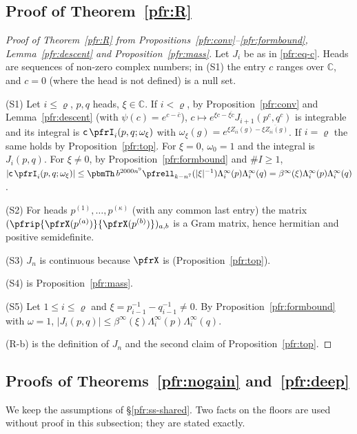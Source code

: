 \documentclass[10pt]{amsart}
\theoremstyle{definition}
\theoremstyle{remark}
\newcommand{\C}{\mathbb C}
\begin{document}
\subsection{Proof of Theorem~\ref{pfr:R}}\label{pfr:ss-Rproof}

\begin{proof}[Proof of Theorem~\ref{pfr:R} from Propositions~\ref{pfr:conv}--\ref{pfr:formbound}, Lemma~\ref{pfr:descent} and Proposition~\ref{pfr:mass}]
Let $J_i$ be as in \eqref{pfr:eq-c}. Heads are sequences of non-zero complex numbers; in (S1) the entry
$c$ ranges over $\C$, and $c=0$ (where the head is not defined) is a null set.

(S1) Let $i\le\varrho$, $p,q$ heads, $\xi\in\C$. If $i<\varrho$, by Proposition~\ref{pfr:conv} and
Lemma~\ref{pfr:descent} (with $\psi(c)=e^{c-\bar c}$), $c\mapsto e^{\xi c-\overline{\xi c}}J_{i+1}(p^c,q^c)$ is
integrable and its integral is $\mathsf c\,\pfrI_i(p,q;\omega_\xi)$ with $\omega_\xi(g)=e^{\xi Z_{ii}(g)-
\overline{\xi Z_{ii}(g)}}$. If $i=\varrho$ the same holds by Proposition~\ref{pfr:top}. For $\xi=0$,
$\omega_0=1$ and the integral is $J_i(p,q)$. For $\xi\ne0$, by Proposition~\ref{pfr:formbound} and
$\#I\ge1$,
$|\mathsf c\,\pfrI_i(p,q;\omega_\xi)|\le\pbmTh\,b^{2000n^9}\pfrell_{k-n^7}(|\xi|^{-1})\Lambda^\infty_i(p)\Lambda^\infty_i(q)
=\beta^\infty(\xi)\Lambda^\infty_i(p)\Lambda^\infty_i(q)$.

(S2) For heads $p^{(1)},\dots,p^{(\kappa)}$ (with any common last entry) the matrix
$(\pfrip{\pfrX(p^{(a)})}{\pfrX(p^{(b)})})_{a,b}$ is a Gram matrix, hence hermitian and positive
semidefinite.

(S3) $J_n$ is continuous because $\pfrX$ is (Proposition~\ref{pfr:top}).

(S4) is Proposition~\ref{pfr:mass}.

(S5) Let $1\le i\le\varrho$ and $\xi=p_{i-1}^{-1}-q_{i-1}^{-1}\ne0$. By Proposition~\ref{pfr:formbound}
with $\omega=1$, $|J_i(p,q)|\le\beta^\infty(\xi)\Lambda^\infty_i(p)\Lambda^\infty_i(q)$.

(R-b) is the definition of $J_n$ and the second claim of Proposition~\ref{pfr:top}.
\end{proof}

\subsection{Proofs of Theorems~\ref{pfr:nogain} and~\ref{pfr:deep}}\label{pfr:ss-gainsproof}

We keep the assumptions of \S\ref{pfr:ss-shared}. Two facts on the floors are used without proof in
this subsection; they are stated exactly.
\end{document}
